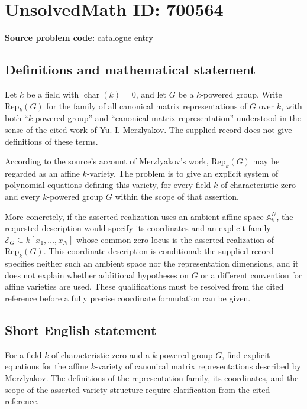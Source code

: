 \documentclass[11pt]{article}
\begin{document}
\section*{UnsolvedMath ID: 700564}
\textbf{Source problem code:} catalogue entry
\subsection{Definitions and mathematical statement}
Let \(k\) be a field with \(\operatorname{char}(k)=0\), and let \(G\) be a \(k\)-powered group. Write \(\mathrm{Rep}_k(G)\) for the family of all canonical matrix representations of \(G\) over \(k\), with both ``\(k\)-powered group'' and ``canonical matrix representation'' understood in the sense of the cited work of Yu. I. Merzlyakov. The supplied record does not give definitions of these terms.

According to the source's account of Merzlyakov's work, \(\mathrm{Rep}_k(G)\) may be regarded as an affine \(k\)-variety. The problem is to give an explicit system of polynomial equations defining this variety, for every field \(k\) of characteristic zero and every \(k\)-powered group \(G\) within the scope of that assertion.

More concretely, if the asserted realization uses an ambient affine space \(\mathbb{A}_k^N\), the requested description would specify its coordinates and an explicit family \(\mathcal E_G\subseteq k[x_1,\ldots,x_N]\) whose common zero locus is the asserted realization of \(\mathrm{Rep}_k(G)\). This coordinate description is conditional: the supplied record specifies neither such an ambient space nor the representation dimensions, and it does not explain whether additional hypotheses on \(G\) or a different convention for affine varieties are used. These qualifications must be resolved from the cited reference before a fully precise coordinate formulation can be given.
\subsection{Short English statement}
For a field \(k\) of characteristic zero and a \(k\)-powered group \(G\), find explicit equations for the affine \(k\)-variety of canonical matrix representations described by Merzlyakov. The definitions of the representation family, its coordinates, and the scope of the asserted variety structure require clarification from the cited reference.
\end{document}

